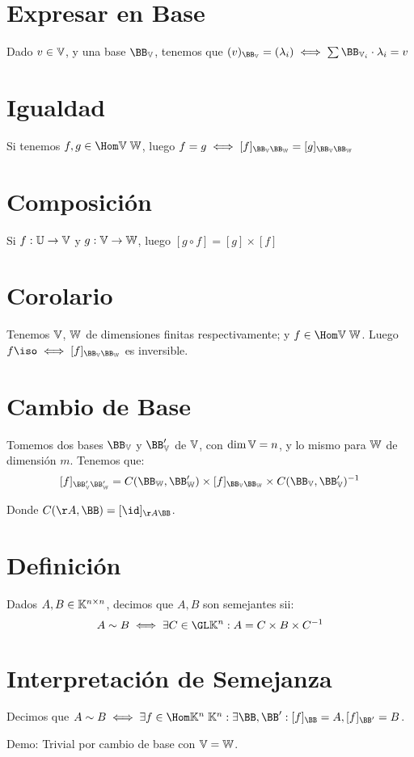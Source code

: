 \documentclass{article}
\begin{document}
\section*{Expresar en Base}
Dado $v \in \mathbb{V}$, y una base $\BB_\V$, tenemos que $(v)_{\BB_\V} = (\lambda_i)
\iff \sum \BB_{\V_i} \cdot \lambda_i = v$

\section*{Igualdad}
Si tenemos $f, g \in \Hom \V \; \W$, luego $f = g \iff [f]_{\BB_\V\BB_\W} =
[g]_{\BB_\V\BB_\W}$

\section*{Composición}
Si $f : \mathbb{U} \to \mathbb{V}$ y $g : \mathbb{V} \to \mathbb{W}$, luego $[g \circ f] = [g] \times [f]$

\section*{Corolario}
Tenemos $\mathbb{V}$, $\mathbb{W}$ de dimensiones finitas respectivamente; y $f \in \Hom \V
\; \W$. Luego $f \iso \iff [f]_{\BB_\V\BB_\W}$ es inversible.

\section*{Cambio de Base}
Tomemos dos bases $\BB_\V$ y $\BB_\V'$ de $\mathbb{V}$, con $\dim \mathbb{V} = n$, y lo mismo
para $\mathbb{W}$ de dimensión $m$. Tenemos que:
\[[f]_{\BB'_\V\BB'_\W} = C(\BB_\W, \BB'_\W) \times [f]_{\BB_\V\BB_\W}
\times C(\BB_\V, \BB'_\V)^{-1}\]

Donde $C(\AA, \BB) = [\id]_{\AA\BB}$.

\section*{Definición}
Dados $A, B \in \mathbb{K}^{n \times n}$, decimos que $A, B$ son semejantes sii:
\[A \sim B \iff \exists C \in \GL\K^n : A = C \times B \times C^{-1}\]

\section*{Interpretación de Semejanza}
Decimos que $A \sim B \iff \exists f \in \Hom \K^n \; \K^n :\exists \BB, \BB'
: [f]_\BB = A, [f]_{\BB'} = B$.

Demo: Trivial por cambio de base con $\mathbb{V} = \mathbb{W}$.
\end{document}
